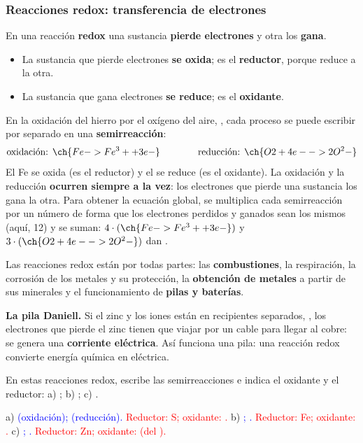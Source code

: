 \subsubsection{Reacciones redox: transferencia de electrones}

\begin{definition}
    En una reacción \textbf{redox} una sustancia \textbf{pierde electrones} y otra los \textbf{gana}.
    \begin{itemize}
        \item La sustancia que pierde electrones \textbf{se oxida}; es el \textbf{reductor}, porque reduce a la otra.
        \item La sustancia que gana electrones \textbf{se reduce}; es el \textbf{oxidante}.
    \end{itemize}
\end{definition}

En la oxidación del hierro por el oxígeno del aire, , cada proceso se puede escribir por separado
en una \textbf{semirreacción}:
\[ \text{oxidación: } \ch{Fe -> Fe^3+ + 3 e-} \qquad\qquad \text{reducción: } \ch{O2 + 4 e- -> 2 O^2-} \]
El Fe se oxida (es el reductor) y el  se reduce (es el oxidante). La oxidación y la reducción \textbf{ocurren siempre a la
vez}: los electrones que pierde una sustancia los gana la otra. Para obtener la ecuación global, se multiplica cada semirreacción
por un número de forma que los electrones perdidos y ganados sean los mismos (aquí, 12) y se suman: \(4 \cdot (\ch{Fe -> Fe^3+ +
3 e-})\) y \(3 \cdot (\ch{O2 + 4 e- -> 2 O^2-})\) dan .

Las reacciones redox están por todas partes: las \textbf{combustiones}, la respiración, la corrosión de los metales y su protección,
la \textbf{obtención de metales} a partir de sus minerales y el funcionamiento de \textbf{pilas y baterías}.

\begin{remark}
    \textbf{La pila Daniell.} Si el zinc y los iones  están en recipientes separados, ,
    los electrones que pierde el zinc tienen que viajar por un cable para llegar al cobre: se genera una \textbf{corriente
    eléctrica}. Así funciona una pila: una reacción redox convierte energía química en eléctrica.
\end{remark}

\begin{exercise}
    En estas reacciones redox, escribe las semirreacciones e indica el oxidante y el reductor: a) ;
    b) ; c) .
    \begin{solu}
        a) \textcolor{blue}{ (oxidación);  (reducción).} \textcolor{red}{Reductor: S;
        oxidante: .} b) \textcolor{blue}{; .} \textcolor{red}{Reductor: Fe;
        oxidante: .} c) \textcolor{blue}{; .} \textcolor{red}{Reductor: Zn;
        oxidante:  (del ).}
    \end{solu}
\end{exercise}

